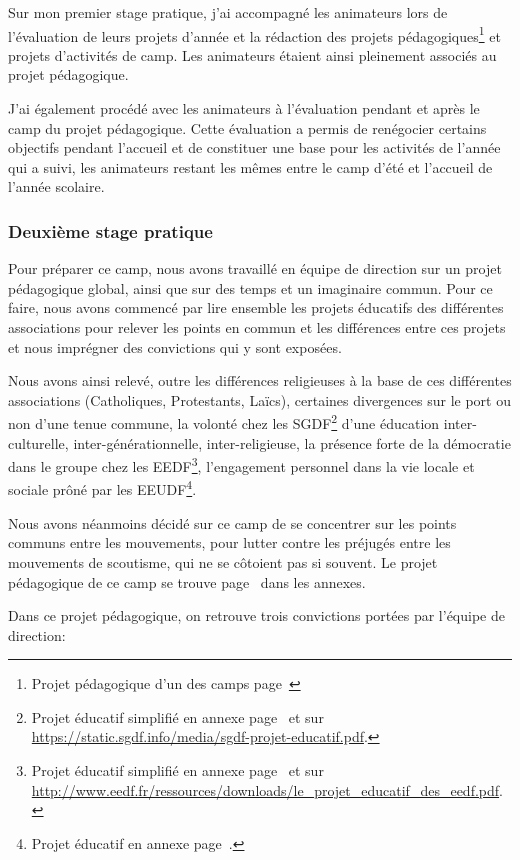 \documentclass[titlepage,11pt,a4paper]{article}
\begin{document}
Sur mon premier stage pratique, j'ai accompagné les animateurs lors de l'évaluation de
leurs projets d'année et la rédaction des projets pédagogiques\footnote{Projet pédagogique
d'un des camps page~\pageref{projetpedmarins}} et projets d'activités de
camp. Les animateurs étaient ainsi pleinement associés au projet pédagogique.

J'ai également procédé avec les animateurs à l'évaluation pendant et après le camp du
projet pédagogique. Cette évaluation a permis de renégocier certains objectifs pendant
l'accueil et de constituer une base pour les activités de l'année qui a suivi, les
animateurs restant les mêmes entre le camp d'été et l'accueil de l'année scolaire.

\subsubsection{Deuxième stage pratique}

Pour préparer ce camp, nous avons travaillé en équipe de direction sur un projet
pédagogique global, ainsi que sur des temps et un imaginaire commun. Pour ce faire, nous avons
commencé par lire ensemble les projets éducatifs des différentes associations pour relever
les points en commun et les différences entre ces projets et nous imprégner des
convictions qui y sont exposées.

Nous avons ainsi relevé, outre les différences religieuses à la base de ces différentes
associations (Catholiques, Protestants, Laïcs), certaines divergences sur
le port ou non d'une tenue commune, la volonté chez les SGDF\footnote{Projet éducatif simplifié en
annexe page~\pageref{pesgdf} et sur \url{https://static.sgdf.info/media/sgdf-projet-educatif.pdf}.}
d'une éducation inter-culturelle, inter-générationnelle, inter-religieuse, la présence forte de la
démocratie dans le groupe chez les EEDF\footnote{Projet éducatif simplifié en annexe page~\pageref{peeedf} et sur
\url{http://www.eedf.fr/ressources/downloads/le_projet_educatif_des_eedf.pdf}.}, l'engagement personnel dans la vie locale et
sociale prôné par les EEUDF\footnote{Projet éducatif en annexe page~\pageref{peeeudf}.}.

Nous avons néanmoins décidé sur ce camp de se concentrer sur les points communs entre les
mouvements, pour lutter contre les préjugés entre les mouvements de scoutisme, qui ne se
côtoient pas si souvent. Le projet pédagogique de ce camp se trouve page~\pageref{projped}
dans les annexes.

Dans ce projet pédagogique, on retrouve trois convictions portées par l'équipe de direction:
\end{document}

